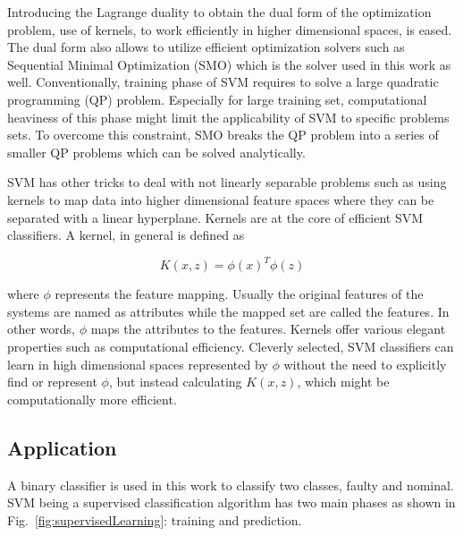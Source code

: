 Introducing the Lagrange duality to obtain the dual form of the optimization problem, use of kernels, to work efficiently in higher dimensional spaces, is eased. 
The dual form also allows to utilize efficient optimization solvers such as Sequential Minimal Optimization (SMO)  \cite{platt1998sequential} which is the solver used in this work as well. Conventionally, training phase of SVM requires to solve a large quadratic programming (QP) problem. Especially for large training set, computational heaviness of this phase might limit the applicability of SVM to specific problems sets. To overcome this constraint, SMO breaks the QP problem into a series of smaller QP problems which can be solved analytically. 


SVM has other tricks to deal with not linearly separable problems such as using kernels to map data into higher dimensional feature spaces where they can be separated with a linear hyperplane. Kernels are at the core of efficient SVM classifiers. A kernel, in general is defined as

\begin{equation}
K (x,z) = {\phi(x)}^T \phi(z)
\end{equation}

where $\phi$ represents the feature mapping. Usually the original features of the systems are named as attributes while the mapped set are called the features. In other words, $\phi$ maps the attributes to the features. Kernels offer various elegant properties such as computational efficiency. 
Cleverly selected, SVM classifiers can learn in high dimensional spaces represented by $\phi$ without the need to explicitly find or represent $\phi$, but instead calculating $K(x,z)$, which might be computationally more efficient. 

 
\subsection{Application}


A binary classifier is used in this work to classify two classes, faulty and nominal. 
SVM being a supervised classification algorithm has two main phases as shown in Fig.~\ref{fig:supervisedLearning}: training and prediction. 


